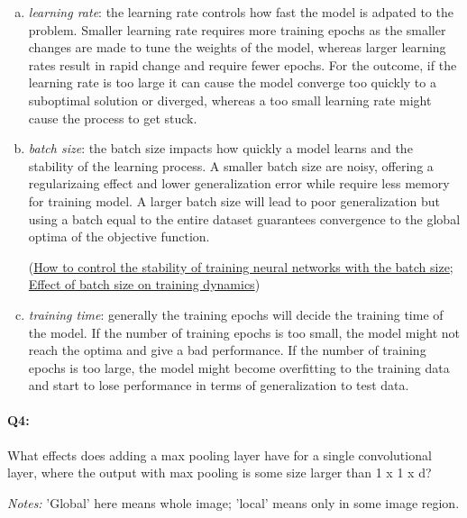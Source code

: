 \begin{enumerate}[(a)]

    \item \emph{learning rate}: the learning rate controls how fast the model is adpated to the problem. Smaller learning rate requires more training epochs as the smaller changes are made to tune the weights of the model, whereas larger learning rates result in rapid change and require fewer epochs. For the outcome, if the learning rate is too large it can cause the model converge too quickly to a suboptimal solution or diverged, whereas a too small learning rate might cause the process to get stuck.

    \item \emph{batch size}: the batch size impacts how quickly a model learns and the stability of the learning process. A smaller batch size are noisy, offering a regularizaing effect and lower generalization error while require less memory for training model. A larger batch size will lead to poor generalization but using a batch equal to the entire dataset guarantees convergence to the global optima of the objective function.

          (\href{https://machinelearningmastery.com/how-to-control-the-speed-and-stability-of-training-neural-networks-with-gradient-descent-batch-size/}{How to control the stability of training neural networks with the batch size}; \href{https://medium.com/mini-distill/effect-of-batch-size-on-training-dynamics-21c14f7a716e}{Effect of batch size on training dynamics})
    \item \emph{training time}: generally the training epochs will decide the training time of the model. If the number of training epochs is too small, the model might not reach the optima and give a bad performance. If the number of training epochs is too large, the model might become overfitting to the training data and start to lose performance in terms of generalization to test data.

\end{enumerate}


\pagebreak
\paragraph{Q4:} What effects does adding a max pooling layer have for a single convolutional layer, where the output with max pooling is some size larger than 1 x 1 x d?

\emph{Notes:} 'Global' here means whole image; 'local' means only in some image region.

